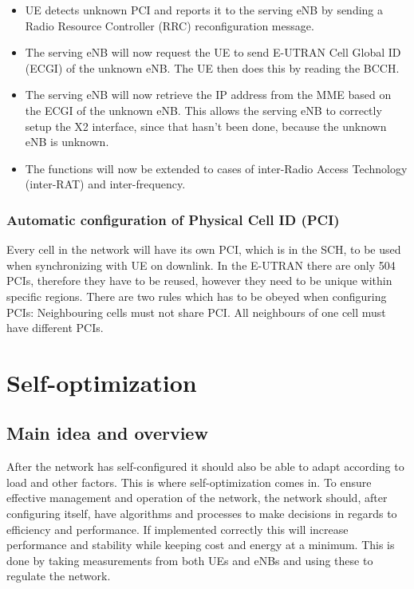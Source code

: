 \documentclass{report}
\begin{document}
\begin{itemize}
	\item UE detects unknown PCI and reports it to the serving eNB by sending a Radio Resource Controller (RRC) reconfiguration message.
	\item The serving eNB will now request the UE to send E-UTRAN Cell Global ID (ECGI) of the unknown eNB. The UE then does this by reading the BCCH. 
	\item The serving eNB will now retrieve the IP address from the MME based on the ECGI of the unknown eNB. This allows the serving eNB to correctly setup the X2 interface, since that hasn't been done, because the unknown eNB is unknown. 
	\item The functions will now be extended to cases of inter-Radio Access Technology (inter-RAT) and inter-frequency. \cite{Atayero2014}
\end{itemize}

\subsection{Automatic configuration of Physical Cell ID (PCI)}
Every cell in the network will have its own PCI, which is in the SCH, to be used when synchronizing with UE on downlink. In the E-UTRAN there are only 504 PCIs, therefore they have to be reused, however they need to be unique within specific regions. There are two rules which has to be obeyed when configuring PCIs: 
Neighbouring cells must not share PCI. 
All neighbours of one cell must have different PCIs. \cite{Feng2008}


\chapter{Self-optimization}
\section{Main idea and overview}
After the network has self-configured it should also be able to adapt according to load and other factors. This is where self-optimization comes in. To ensure effective management and operation of the network, the network should, after configuring itself, have algorithms and processes to make decisions in regards to efficiency and performance. If implemented correctly this will increase performance and stability while keeping cost and energy at a minimum. This is done by taking measurements from both UEs and eNBs and using these to regulate the network. 
\end{document}
